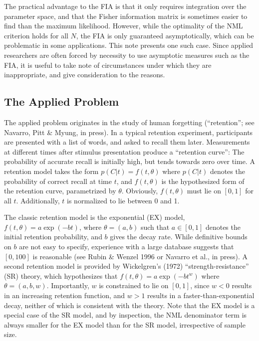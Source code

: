 \documentclass[doc,floatsintext]{apa6}
\begin{document}
The practical advantage to the FIA is that it only requires integration over the parameter space, and that the Fisher information matrix is sometimes easier to find than the maximum likelihood. However, while the optimality of the NML criterion holds for all $N$, the FIA is only guaranteed asymptotically, which can be problematic in some applications. This note presents one such case. Since applied researchers are often forced by necessity to use asymptotic measures such as the FIA, it is useful to take note of circumstances under which they are inappropriate, and give consideration to the reasons.

\subsection*{The Applied Problem}

The applied problem originates in the study of human forgetting (``retention''; see Navarro, Pitt \& Myung, in press). In a typical retention experiment, participants are presented with a list of words, and asked to recall them later. Measurements at different times after stimulus presentation produce a ``retention curve'': The probability of accurate recall is initially high, but tends towards zero over time. A retention model takes the form $p(C|t) = f(t,\theta)$ where $p(C|t)$ denotes the probability of correct recall at time $t$, and $f(t,\theta)$ is the hypothesized form of the retention curve, parametrized by $\theta$. Obviously, $f(t,\theta)$ must lie on $[0, 1]$ for all $t$. Additionally, $t$ is normalized to lie between 0 and 1.

The classic retention model is the exponential (EX) model, $f(t, \theta)=a\exp(-bt)$, where $\theta = (a, b)$ such that $a \in [0,1]$ denotes the initial retention probability, and $b$ gives the decay rate. While definitive bounds on $b$ are not easy to specify, experience with a large database suggests that $[0,100]$ is reasonable (see Rubin \& Wenzel 1996 or Navarro et al., in press). A second retention model is provided by Wickelgren's (1972) ``strength-resistance'' (SR) theory, which hypothesizes that $f(t, \theta)=a\exp(-bt^w)$ where $\theta = (a, b, w)$. Importantly, $w$ is constrained to lie on $[0,1]$, since $w<0$ results in an increasing retention function, and $w>1$ results in a faster-than-exponential decay, neither of which is consistent with the theory. Note that the EX model is a special case of the SR model, and by inspection, the NML denominator term is always smaller for the EX model than for the SR model, irrespective of sample size.
\end{document}
